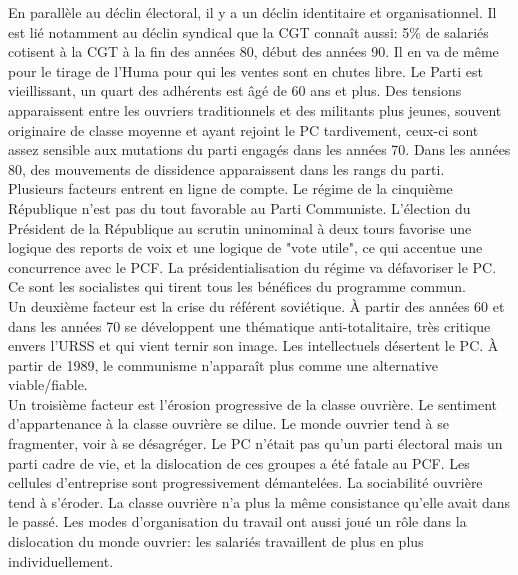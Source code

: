 \documentclass[10pt, a4paper, openany]{book}
\begin{document}
En parallèle au déclin électoral, il y a un déclin identitaire et organisationnel. Il est lié notamment au déclin syndical que la CGT connaît aussi: 5\% de salariés cotisent à la CGT à la fin des années 80, début des années 90. Il en va de même pour le tirage de l'Huma pour qui les ventes sont en chutes libre. Le Parti est vieillissant, un quart des adhérents est âgé de 60 ans et plus. Des tensions apparaissent entre les ouvriers traditionnels et des militants plus jeunes, souvent originaire de classe moyenne et ayant rejoint le PC tardivement, ceux-ci sont assez sensible aux mutations du parti engagés dans les années 70. Dans les années 80, des mouvements de dissidence apparaissent dans les rangs du parti. \\
Plusieurs facteurs entrent en ligne de compte. Le régime de la cinquième République n'est pas du tout favorable au Parti Communiste. L'élection du Président de la République au scrutin uninominal à deux tours favorise une logique des reports de voix et une logique de "vote utile", ce qui accentue une concurrence avec le PCF. La présidentialisation du régime va défavoriser le PC. Ce sont les socialistes qui tirent tous les bénéfices du programme commun. \\
Un deuxième facteur est la crise du référent soviétique. À partir des années 60 et dans les années 70 se développent une thématique anti-totalitaire, très critique envers l'URSS et qui vient ternir son image. Les intellectuels désertent le PC. À partir de 1989, le communisme n'apparaît plus comme une alternative viable/fiable. \\
Un troisième facteur est l'érosion progressive de la classe ouvrière. Le sentiment d'appartenance à la classe ouvrière se dilue. Le monde ouvrier tend à se fragmenter, voir à se désagréger. Le PC n'était pas qu'un parti électoral mais un parti cadre de vie, et la dislocation de ces groupes a été fatale au PCF. Les cellules d'entreprise sont progressivement démantelées. La sociabilité ouvrière tend à s'éroder. La classe ouvrière n'a plus la même consistance qu'elle avait dans le passé. Les modes d'organisation du travail ont aussi joué un rôle dans la dislocation du monde ouvrier: les salariés travaillent de plus en plus individuellement.
\end{document}
